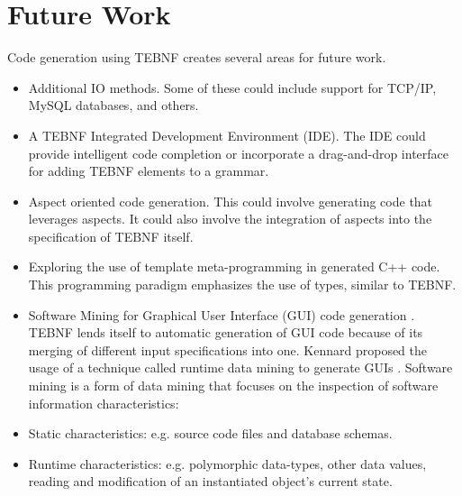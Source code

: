 \chapter{Future Work}
Code generation using TEBNF creates several areas for future work.
\begin{itemize}
  \item Additional IO methods.  Some of these could include support for TCP/IP, MySQL databases, and others.
  \item A TEBNF Integrated Development Environment (IDE).  The IDE could provide intelligent code completion or incorporate a drag-and-drop interface for adding TEBNF elements to a grammar.
  \item Aspect oriented code generation.  This could involve generating code that leverages aspects.  It could also involve the integration of aspects into the specification of TEBNF itself.
  \item Exploring the use of template meta-programming in generated C++ code.  This programming paradigm emphasizes the use of types, similar to TEBNF.
  \item Software Mining for Graphical User Interface (GUI) code generation \cite{kennard_01,kennard_02}.  TEBNF lends itself to automatic generation of GUI code because of its merging of different input specifications into one.   Kennard proposed the usage of a technique called runtime data mining to generate GUIs \cite{kennard_01}.  Software mining \cite{kennard_02} is a form of data mining that focuses on the inspection of software information characteristics:
  \item Static characteristics: e.g. source code files and database schemas.
  \item Runtime characteristics: e.g. polymorphic data-types, other data values, reading and modification of an instantiated object’s current state.
\end{itemize}
